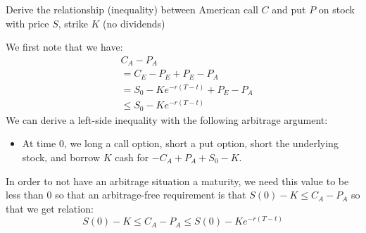 \documentclass[12pt,twoside, letter]{exam}
\theoremstyle{definition}
\begin{document}
  \par{Derive the relationship (inequality) between American call $C$
    and put $P$ on stock with price $S$, strike $K$ (no dividends)}
      \begin{solution}
        We first note that we have:
        \begin{align*}
          &C_A - P_A \\
          &=C_E - P_E + P_E - P_A \\
          &=S_0 - Ke^{-r(T-t)} + P_E - P_A \\
          &\leq S_0 - Ke^{-r(T-t)}
        \end{align*}
        We can derive a left-side inequality with the following arbitrage argument: \\
        \begin{itemize}
          \item At time $0$, we long a call option, short a put option, short the underlying stock, and borrow $K$ cash for
           $-C_A + P_A + S_0 - K$.
        \end{itemize}
        In order to not have an arbitrage situation a maturity, we need this value to be less than 0 so that an arbitrage-free requirement is that
        $S(0) - K \leq C_A - P_A$ so that we get relation:
        \begin{equation*}
          S(0) - K \leq C_A - P_A \leq S(0) - Ke^{-r(T-t)}
        \end{equation*}
      \end{solution}
\end{document}
